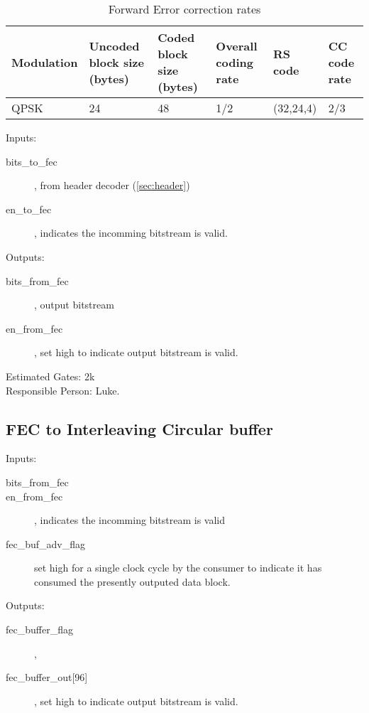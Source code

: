 \documentclass[10pt,twocolumn]{article}
\begin{document}
		\begin{table}
			\begin{tabular}{p{2cm}|p{2cm}|p{2cm}|p{2cm}|p{2cm}|p{2cm}}
			\label{tbl:fec}
				Modulation & Uncoded block size (bytes) &
				Coded block size (bytes) & Overall coding
				rate & RS code & CC code rate \\ \hline
				QPSK & 24 & 48 & 1/2 & (32,24,4) & 2/3 \\
			\end{tabular}
			\caption{Forward Error correction rates}
		\end{table}

		\begin{description}
			\item{Inputs:} \begin{description}
				\item[bits\_to\_fec], from header decoder
					(\autoref{sec:header})
				\item[en\_to\_fec], indicates the incomming
					bitstream is valid.
			\end{description}
			\item{Outputs:} \begin{description}
				\item[bits\_from\_fec], output bitstream
				\item[en\_from\_fec], set high to indicate
					output bitstream is valid.
			\end{description}
		\end{description}

		Estimated Gates: 2k \\
		Responsible Person: Luke.

	\subsection{FEC to Interleaving Circular buffer}
		\label{sec:fec_buffer}

		\begin{description}
			\item{Inputs:} \begin{description}
				\item[bits\_from\_fec]
				\item[en\_from\_fec], indicates the incomming
					bitstream is valid
				\item[fec\_buf\_adv\_flag] set high for a
					single clock cycle by the consumer to
					indicate it has consumed the
					presently outputed data block.
			\end{description}
			\item{Outputs:} \begin{description}
				\item[fec\_buffer\_flag], 
				\item[fec\_buffer\_out{[96]}], set high to indicate
					output bitstream is valid.
			\end{description}
		\end{description}
\end{document}
